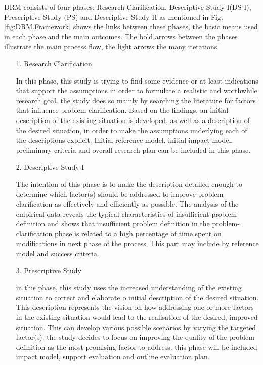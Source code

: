 DRM consists of four phases: Research Clarification, Descriptive Study I(DS I), Prescriptive Study (PS) and Descriptive Study II as mentioned in  Fig. \ref{fig:DRM.Framework} shows the links between these phases, the basic means used in each phase and the main outcomes. The bold arrows between the phases illustrate the main process flow, the light arrows the many iterations.
\begin{enumerate}
\item[1.]Research Clarification\par
In this phase, this study is trying to find some evidence or at least indications that support the assumptions in order to formulate a realistic and worthwhile research goal. the study does so mainly by searching the literature for factors that influence problem clarification. Based on the findings, an initial description of the existing situation is developed, as well as a description of the desired situation, in order to make the assumptions underlying each of the descriptions explicit. Initial reference model, initial impact model, preliminary criteria and overall research plan can be included in this phase.
\item[2.]Descriptive Study I\par
The intention of this phase is to make the description detailed enough to determine which factor(s) should be addressed to improve problem clarification as effectively and efficiently as possible. The analysis of the empirical data reveals the typical characteristics of insufficient problem definition and shows that insufficient problem definition in the problem-clarification phase is related to a high percentage of time spent on modifications in next phase of the process. This part may include by reference model and success criteria.
\item[3.]Prescriptive Study\par
in this phase, this study uses the increased understanding of the existing situation to correct and elaborate o initial description of the desired situation. This description represents the vision on how addressing one or more factors in the existing situation would lead to the realisation of the desired, improved situation. This can develop various possible scenarios by varying the targeted factor(s). the study decides to focus on improving the quality of the problem definition as the most promising factor to address. this phase will be included impact model, support evaluation and outline evaluation plan. 

\end{enumerate}
